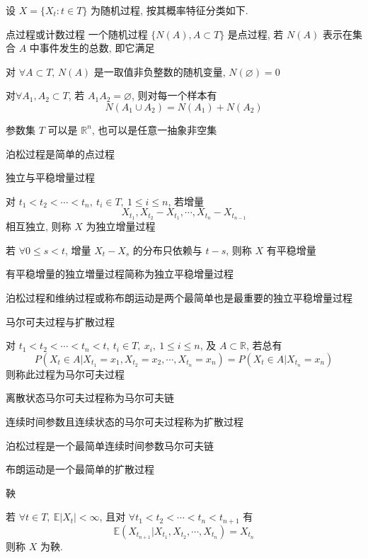 \documentclass[openany]{ctexbook}
\theoremstyle{kaiti}
\theoremstyle{normal}
\begin{document}
设 $X=\{X_t:t\in T\}$ 为随机过程, 按其概率特征分类如下.

点过程或计数过程
一个随机过程 $\{N(A),A\subset T\}$ 是点过程, 若 $N(A)$ 表示在集合 $A$ 中事件发生的总数, 即它满足

 对 $\forall A\subset T$, $N(A)$ 是一取值非负整数的随机变量, $N(\varnothing)=0$

 对$\forall A_1,A_2\subset T$, 若 $A_1A_2=\varnothing$, 则对每一个样本有
\begin{equation}
  N(A_1\cup A_2)=N(A_1)+N(A_2)
\end{equation}


 参数集 $T$ 可以是 $\mathbb{R}^n$, 也可以是任意一抽象非空集

 泊松过程是简单的点过程

独立与平稳增量过程

 对 $t_1<t_2<\cdots<t_n,~t_i\in T,~1\leqslant i\leqslant n$, 若增量
\begin{equation}
  X_{t_1},X_{t_2}-X_{t_1},\cdots,X_{t_n}-X_{t_{n-1}}
\end{equation}
 相互独立, 则称 $X$ 为独立增量过程

 若 $\forall0\leqslant s<t$, 增量 $X_t-X_s$ 的分布只依赖与 $t-s$, 则称 $X$ 有平稳增量

 有平稳增量的独立増量过程简称为独立平稳增量过程

 泊松过程和维纳过程或称布朗运动是两个最简单也是最重要的独立平稳增量过程

马尔可夫过程与扩散过程

对 $t_1<t_2<\cdots<t_n<t,~t_i\in T,~x_i,~1\leqslant i\leqslant n$, 及 $A\subset\mathbb{R}$, 若总有
\begin{equation}
  P(X_t\in A|X_{t_1}=x_1,X_{t_2}=x_2,\cdots,X_{t_n}=x_n)=P(X_t\in A|X_{t_n}=x_n)
\end{equation}
 则称此过程为马尔可夫过程

离散状态马尔可夫过程称为马尔可夫链

连续时间参数且连续状态的马尔可夫过程称为扩散过程

泊松过程是一个最简单连续时间参数马尔可夫链

布朗运动是一个最简单的扩散过程

鞅

 若 $\forall t\in T,~\mathbb{E}|X_t|<\infty$, 且对 $\forall t_1<t_2<\cdots<t_n<t_{n+1}$ 有
\begin{equation}
  \mathbb{E}(X_{t_{n+1}}|X_{t_1},X_{t_2},\cdots,X_{t_n})=X_{t_n}
\end{equation}
 则称 $X$ 为鞅.
\end{document}
